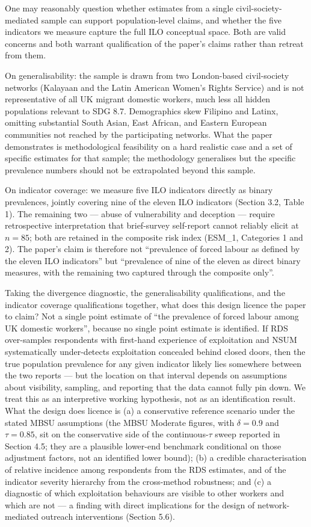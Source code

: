 \documentclass[
  12pt,
  letterpaper,
  DIV=11,
  numbers=noendperiod]{scrartcl}
\begin{document}
One may reasonably question whether estimates from a single
civil-society-mediated sample can support population-level claims, and
whether the five indicators we measure capture the full ILO conceptual
space. Both are valid concerns and both warrant qualification of the
paper's claims rather than retreat from them.

On generalisability: the sample is drawn from two London-based
civil-society networks (Kalayaan and the Latin American Women's Rights
Service) and is not representative of all UK migrant domestic workers,
much less all hidden populations relevant to SDG 8.7. Demographics skew
Filipino and Latinx, omitting substantial South Asian, East African, and
Eastern European communities not reached by the participating networks.
What the paper demonstrates is methodological feasibility on a hard
realistic case and a set of specific estimates for that sample; the
methodology generalises but the specific prevalence numbers should not
be extrapolated beyond this sample.

On indicator coverage: we measure five ILO indicators directly as binary
prevalences, jointly covering nine of the eleven ILO indicators (Section
3.2, Table 1). The remaining two --- abuse of vulnerability and
deception --- require retrospective interpretation that brief-survey
self-report cannot reliably elicit at \(n = 85\); both are retained in
the composite risk index (ESM\_1, Categories 1 and 2). The paper's claim
is therefore not ``prevalence of forced labour as defined by the eleven
ILO indicators'' but ``prevalence of nine of the eleven as direct binary
measures, with the remaining two captured through the composite only''.

Taking the divergence diagnostic, the generalisability qualifications,
and the indicator coverage qualifications together, what does this
design licence the paper to claim? Not a single point estimate of ``the
prevalence of forced labour among UK domestic workers'', because no
single point estimate is identified. If RDS over-samples respondents
with first-hand experience of exploitation and NSUM systematically
under-detects exploitation concealed behind closed doors, then the true
population prevalence for any given indicator likely lies somewhere
between the two reports --- but the location on that interval depends on
assumptions about visibility, sampling, and reporting that the data
cannot fully pin down. We treat this as an interpretive working
hypothesis, not as an identification result. What the design does
licence is (a) a conservative reference scenario under the stated MBSU
assumptions (the MBSU Moderate figures, with \(\delta = 0.9\) and
\(\tau = 0.85\), sit on the conservative side of the continuous-\(\tau\)
sweep reported in Section 4.5; they are a plausible lower-end benchmark
conditional on those adjustment factors, not an identified lower bound);
(b) a credible characterisation of relative incidence among respondents
from the RDS estimates, and of the indicator severity hierarchy from the
cross-method robustness; and (c) a diagnostic of which exploitation
behaviours are visible to other workers and which are not --- a finding
with direct implications for the design of network-mediated outreach
interventions (Section 5.6).
\end{document}

